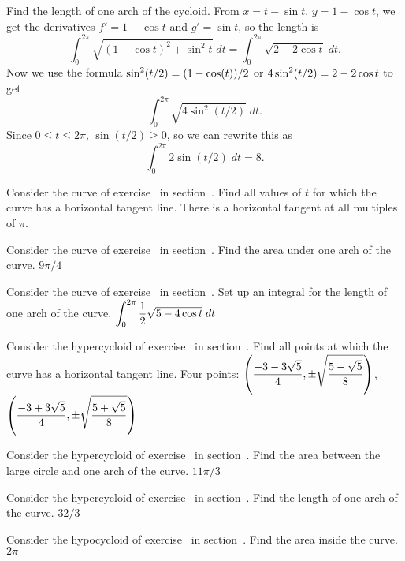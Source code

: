 \example Find the length of one arch of the cycloid.
From $x=t-\sin t$, $y=1-\cos t$, we get the derivatives
$f'=1-\cos t$ and $g'=\sin t$, so the length is 
$$
  \int_0^{2\pi} \sqrt{(1-\cos t)^2+\sin^2 t}\;dt=
  \int_0^{2\pi} \sqrt{2-2\cos t}\;dt.
$$
Now we use the formula $\displaystyle \sin^2(t/2)=(1-\cos(t))/2$ or
$\displaystyle 4\sin^2(t/2)=2-2\cos t$ to get
$$\int_0^{2\pi} \sqrt{4\sin^2(t/2)}\;dt.$$
Since $0\le t\le2\pi$, $\sin(t/2)\ge 0$, so we can rewrite this as
$$\int_0^{2\pi} 2\sin(t/2)\;dt = 8.$$
\endexample

\exercises

\exercise Consider the curve of 
exercise~ in 
section~. Find all values of
$t$ for which the curve has a horizontal tangent line.
\answer There is a horizontal tangent at all multiples of $\pi$.
\endanswer
\endexercise

\exercise Consider the curve of 
exercise~ in 
section~. Find the area under
one arch of the curve.
\answer $9\pi/4$
\endanswer
\endexercise

\exercise Consider the curve of 
exercise~ in 
section~. Set up an integral
for the length of one arch of the curve.
\answer $\displaystyle \int_0^{2\pi}{1\over2} \sqrt{5-4\cos t}\;dt$
\endanswer
\endexercise

\exercise Consider the hypercycloid of 
exercise~ in 
section~. Find all points at
which the curve has a horizontal tangent line.
\answer Four points:\hfill\break
$\displaystyle \left({-3-3\sqrt5\over4},
\pm\sqrt{5-\sqrt5\over8}\right)$,\hfill\break
$\displaystyle \left({-3+3\sqrt5\over4},
\pm\sqrt{5+\sqrt5\over8}\right)$ 
\endanswer
\endexercise

\exercise Consider the hypercycloid of 
exercise~ in 
section~. Find the area between the
large circle and
one arch of the curve.
\answer $11\pi/3$
\endanswer
\endexercise

\exercise Consider the hypercycloid of
exercise~ in section~. Find the length of one arch of the curve.  
\answer $32/3$
\endanswer
\endexercise

\exercise Consider the hypocycloid of 
exercise~ in 
section~. Find the area inside the curve.
\answer $2\pi$
\endanswer
\endexercise

